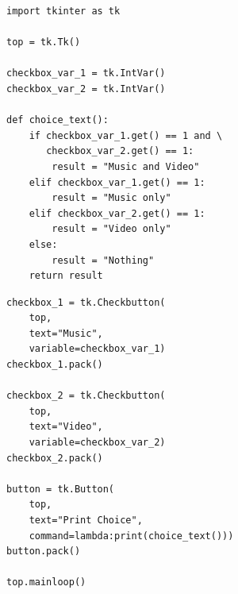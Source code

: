 \begin{frame}[fragile]
%
\begin{tcbraster}[raster columns=2,
                  raster equal height,
                  nobeforeafter,
                  raster column skip=0.5cm]
\begin{codebox}
\begin{verbatim}
import tkinter as tk

top = tk.Tk()

checkbox_var_1 = tk.IntVar()
checkbox_var_2 = tk.IntVar()

def choice_text():
    if checkbox_var_1.get() == 1 and \
       checkbox_var_2.get() == 1:
        result = "Music and Video"
    elif checkbox_var_1.get() == 1:
        result = "Music only"
    elif checkbox_var_2.get() == 1:
        result = "Video only"
    else:
        result = "Nothing"
    return result
\end{verbatim}
\end{codebox}
%
\begin{codebox}[... Continued]
\begin{verbatim}
checkbox_1 = tk.Checkbutton(
    top, 
    text="Music",
    variable=checkbox_var_1)
checkbox_1.pack()

checkbox_2 = tk.Checkbutton(
    top,
    text="Video",
    variable=checkbox_var_2)
checkbox_2.pack()

button = tk.Button(
    top,
    text="Print Choice",
    command=lambda:print(choice_text()))
button.pack()

top.mainloop()
\end{verbatim}
\end{codebox}
\end{tcbraster}
%
\end{frame}


